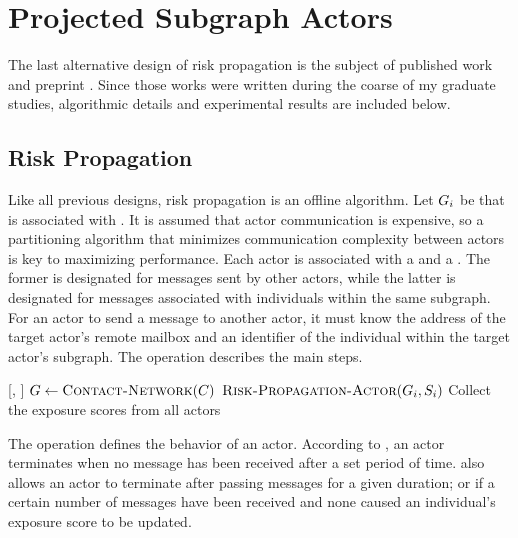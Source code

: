 \section{Projected Subgraph Actors}\label{sec:projected-subgraphs}

The last alternative design of risk propagation is the subject of published work \citep{Tatton2022b} and preprint \citep{Tatton2022a}. Since those works were written during the coarse of my graduate studies, algorithmic details and experimental results are included below.

\subsection{Risk Propagation}

Like all previous designs, risk propagation is an offline algorithm. Let $G_i$ be  that is associated with . It is assumed that actor communication is expensive, so a partitioning algorithm \citep{Buluc2016} that minimizes communication complexity between actors is key to maximizing performance. Each actor is associated with a  and a . The former is designated for messages sent by other actors, while the latter is designated for messages associated with individuals within the same subgraph. For an actor to send a message to another actor, it must know the address of the target actor's remote mailbox and an identifier of the individual within the target actor's subgraph. The \cRiskPropagationMain operation describes the main steps.

\begin{function}{\nRiskPropagationMain}[\vScores, \vContacts]
  \State $\vGraph \assign \Call{Contact-Network}{\vContacts}$
    \State $\cRiskPropagationActor[\vGraph_i, \vScores_i]$
  \EndFor
  \State Collect the exposure scores from all actors
\end{function}

The \cRiskPropagationActor operation defines the behavior of an actor. According to \citet{Tatton2022a,Tatton2022b}, an actor terminates when no message has been received after a set period of time. \citet{Tatton2022a} also allows an actor to terminate after passing messages for a given duration; or if a certain number of messages have been received and none caused an individual's exposure score to be updated.

